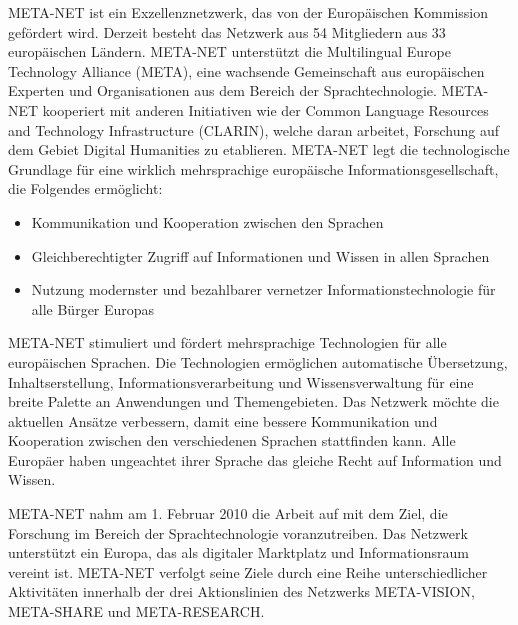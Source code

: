 \documentclass[]{../../metanetpaper}
\begin{document}
\cleardoublepage



\begin{multicols}{2}

META-NET ist ein Exzellenznetzwerk, das von der Europäischen Kommission gefördert wird. Derzeit besteht das Netzwerk aus 54 Mitgliedern aus 33 europäischen Ländern. META-NET unterstützt die Multilingual Europe Technology Alliance (META), eine wachsende Gemeinschaft aus europäischen Experten und Organisationen aus dem Bereich der Sprachtechnologie. 
META-NET kooperiert mit anderen Initiativen wie der Common Language Resources and Technology Infrastructure (CLARIN), welche daran arbeitet, Forschung auf dem Gebiet Digital Humanities zu etablieren. META-NET legt die technologische Grundlage für eine wirklich mehrsprachige europäische Informationsgesellschaft, die Folgendes ermöglicht:

\begin{itemize}
\item Kommunikation und Kooperation zwischen den Sprachen
\item Gleichberechtigter Zugriff auf Informationen und Wissen in allen Sprachen
\item Nutzung modernster und bezahlbarer vernetzer Informationstechnologie für alle Bürger Europas
\end{itemize}

META-NET stimuliert und fördert mehrsprachige Technologien für alle europäischen Sprachen. Die Technologien ermöglichen automatische Übersetzung, Inhaltserstellung, Informationsverarbeitung und Wissensverwaltung für eine breite Palette an Anwendungen und Themengebieten. Das Netzwerk möchte die aktuellen Ansätze verbessern, damit eine bessere Kommunikation und Kooperation zwischen den verschiedenen Sprachen stattfinden kann. Alle Europäer haben ungeachtet ihrer Sprache das gleiche Recht auf Information und Wissen.

META-NET nahm am 1. Februar 2010 die Arbeit auf mit dem Ziel, die Forschung im Bereich der Sprachtechnologie voranzutreiben. Das Netzwerk unterstützt ein Europa, das als digitaler Marktplatz und Informationsraum vereint ist. META-NET verfolgt seine Ziele durch eine Reihe unterschiedlicher Aktivitäten innerhalb der drei Aktionslinien des Netzwerks META-VISION, META-SHARE und META-RESEARCH. 


\end{multicols}
\end{document}
